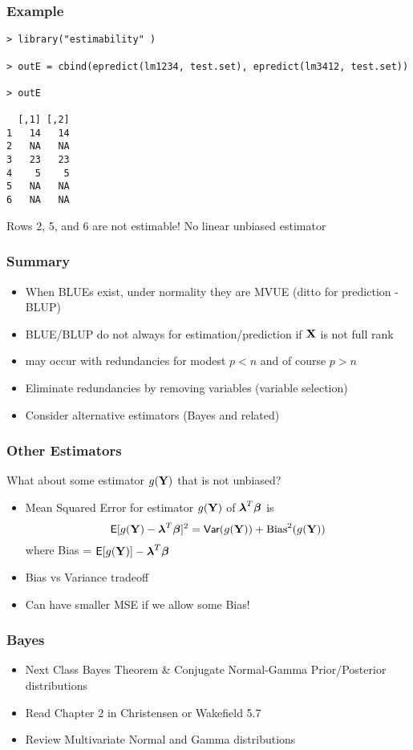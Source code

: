 \documentclass[handout]{beamer}
\begin{document}
\begin{frame}[fragile]\frametitle{Example}
\begin{verbatim}
> library("estimability" )

> outE = cbind(epredict(lm1234, test.set), epredict(lm3412, test.set))

> outE

  [,1] [,2]
1   14   14
2   NA   NA
3   23   23
4    5    5
5   NA   NA
6   NA   NA
\end{verbatim}
Rows 2, 5, and 6 are not estimable!  No linear unbiased estimator

  
\end{frame}
\begin{frame} \frametitle{Summary}
  \begin{itemize}
  \item When BLUEs exist,  under normality they are MVUE  (ditto for
    prediction - BLUP) \pause
 \item BLUE/BLUP do not always for estimation/prediction if $\mathbf{X}$ is
   not full rank \pause
\item may occur with redundancies for modest $p < n$ and of course $p
  > n$ \pause
\item Eliminate redundancies by removing variables (variable
  selection) \pause
\item Consider alternative estimators (Bayes and related)
  \end{itemize}
\end{frame}

\begin{frame} \frametitle{Other Estimators}
What about some estimator $g(\mathbf{Y})$ that is not unbiased? \pause
  \begin{itemize}
\item Mean Squared Error for estimator $g(\mathbf{Y})$ of $\boldsymbol{\lambda}^T\boldsymbol{\beta}$ is
$$\textsf{E}[g(\mathbf{Y}) - \boldsymbol{\lambda}^T\boldsymbol{\beta}]^2 = \textsf{Var}(g(\mathbf{Y})) + \text{Bias}^2(g(\mathbf{Y}))$$ 
where Bias = $\textsf{E}[g(\mathbf{Y})] - \boldsymbol{\lambda}^T\boldsymbol{\beta}$  \pause
\item Bias vs Variance tradeoff \pause
\item Can have smaller MSE if we allow some Bias! 
\end{itemize}
\end{frame}

\begin{frame}\frametitle{Bayes}
  \begin{itemize}
  \item  Next Class Bayes Theorem \& Conjugate Normal-Gamma Prior/Posterior   distributions
  \item  Read   Chapter 2 in Christensen or Wakefield 5.7
  \item  Review Multivariate Normal and Gamma distributions
  \end{itemize}





\end{frame}
\end{document}
